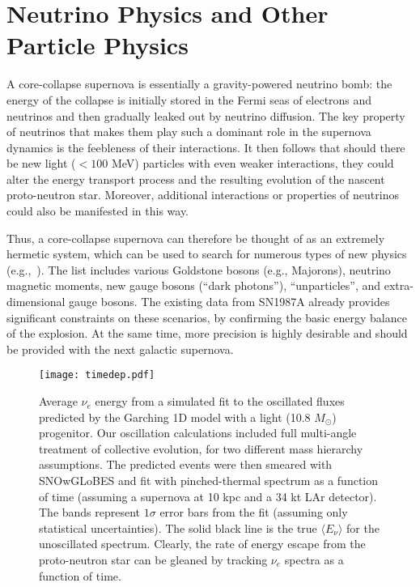 \section{Neutrino Physics and Other Particle Physics}
\label{sec:physics-snblowe-neutrino-physics}

A core-collapse supernova is essentially a gravity-powered neutrino bomb: the energy of the collapse is initially stored in the Fermi seas of electrons and neutrinos and then gradually leaked out by neutrino diffusion. The key property of neutrinos that makes them play such a dominant role in the supernova dynamics is the feebleness of their interactions. It then follows that should there be new light ($< 100$ MeV) particles with even weaker interactions, they could alter the energy transport process and the resulting evolution of the nascent proto-neutron star. Moreover, additional interactions or properties of neutrinos could also be manifested in this way. 

Thus, a core-collapse supernova can therefore be thought of as an extremely hermetic system, which can be used to search for numerous types of new physics (e.g.,~\cite{Schramm:1990pf,Raffelt:1999tx}). The list includes various Goldstone bosons (e.g., Majorons), neutrino magnetic moments, new gauge bosons (``dark photons''), ``unparticles'', and extra-dimensional gauge bosons. The existing data from SN1987A already provides significant constraints on these scenarios, by confirming the basic energy balance of the explosion. At the same time, more precision is highly desirable and should be provided with the next galactic supernova. 

\begin{figure}[!htb]
\centering
\texttt{[image: timedep.pdf]}
\caption[Simulated cooling curves from the Garching light progenitor model]{ Average $\nu_{e}$ energy from a simulated fit to the oscillated fluxes predicted by the Garching 1D model with a light (10.8 $M_{\odot}$) progenitor. Our oscillation calculations included full multi-angle treatment of collective evolution, for two
different mass hierarchy assumptions. The predicted events were then smeared with SNOwGLoBES and fit with pinched-thermal spectrum as a function of time (assuming a supernova at 10 kpc and a 34 kt LAr detector). The bands represent $1\sigma$ error bars from the fit (assuming only statistical uncertainties). The solid black line is the true
$\langle E_{\nu} \rangle$ for the unoscillated spectrum. Clearly, the rate of energy escape from the proto-neutron star can be gleaned by tracking $\nu_{e}$ spectra as a function of time.}
\label{fig:coolingcurves}
\end{figure}


